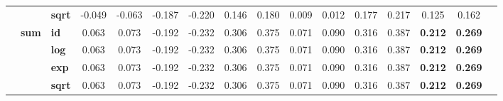 \begin{table}[t!]
{\begin{tabular}{cclccccccccccccc}
                & & \textbf{sqrt} & -0.049 & -0.063 & -0.187 & -0.220 & 0.146 & 0.180 & 0.009 & 0.012 & 0.177 & 0.217 & 0.125 & 0.162 \\
        \cmidrule{2-15}
        & \multirow{4}{*}{\textbf{sum}}
                  & \textbf{id}   & 0.063 & 0.073 & -0.192 & -0.232 & 0.306 & 0.375 & 0.071 & 0.090 & 0.316 & 0.387 & \textbf{0.212} & \textbf{0.269} \\
                & & \textbf{log}  & 0.063 & 0.073 & -0.192 & -0.232 & 0.306 & 0.375 & 0.071 & 0.090 & 0.316 & 0.387 & \textbf{0.212} & \textbf{0.269} \\
                & & \textbf{exp}  & 0.063 & 0.073 & -0.192 & -0.232 & 0.306 & 0.375 & 0.071 & 0.090 & 0.316 & 0.387 & \textbf{0.212} & \textbf{0.269} \\
                & & \textbf{sqrt} & 0.063 & 0.073 & -0.192 & -0.232 & 0.306 & 0.375 & 0.071 & 0.090 & 0.316 & 0.387 & \textbf{0.212} & \textbf{0.269} \\
        \midrule


\end{tabular}}
\end{table}
